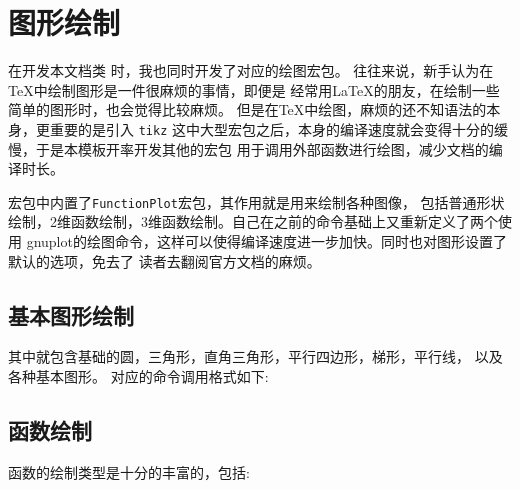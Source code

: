 \section{图形绘制}
在开发本文档类 \zlatex{}时，我也同时开发了对应的绘图宏包。
往往来说，新手认为在\TeX{}中绘制图形是一件很麻烦的事情，即便是
经常用\LaTeX{}的朋友，在绘制一些简单的图形时，也会觉得比较麻烦。
但是在\TeX{}中绘图，麻烦的还不知语法的本身，更重要的是引入 \verb|tikz|
这中大型宏包之后，本身的编译速度就会变得十分的缓慢，于是本模板开率开发其他的宏包
用于调用外部函数进行绘图，减少文档的编译时长。

\zlatex{}宏包中内置了\texttt{FunctionPlot}宏包，其作用就是用来绘制各种图像，
包括普通形状绘制，2维函数绘制，3维函数绘制。自己在之前的命令基础上又重新定义了两个使用
gnuplot的绘图命令，这样可以使得编译速度进一步加快。同时也对图形设置了默认的选项，免去了
读者去翻阅官方文档的麻烦。

\subsection{基本图形绘制}
其中就包含基础的圆，三角形，直角三角形，平行四边形，梯形，平行线，
以及各种基本图形。
对应的命令调用格式如下:
\begin{bytes}
\end{bytes}


\subsection{函数绘制}
函数的绘制类型是十分的丰富的，包括:


